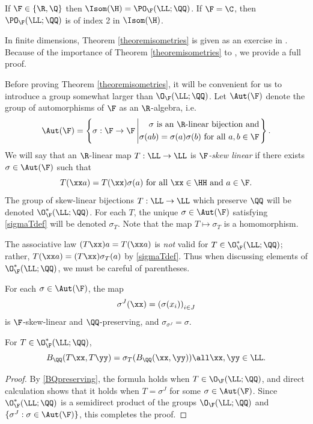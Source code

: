 \begin{theorem}
\label{theoremisometries}
If $\F\in\{\R,\Q\}$ then $\Isom(\H) = \PO_\F(\LL;\QQ)$. If $\F = \C$, then $\PO_\F(\LL;\QQ)$ is of index 2 in $\Isom(\H)$.
\end{theorem}
\begin{remark}
In finite dimensions, Theorem \ref{theoremisometries} is given as an exercise in \cite[Exercise II.10.21]{BridsonHaefliger}. Because of the importance of Theorem \ref{theoremisometries} to \thispaper, we provide a full proof.
\end{remark}
Before proving Theorem \ref{theoremisometries}, it will be convenient for us to introduce a group somewhat larger than $\O_\F(\LL;\QQ)$. Let $\Aut(\F)$ denote the group of automorphisms of $\F$ as an $\R$-algebra, i.e.
\[
\Aut(\F) = \left\{\sigma:\F\to\F \left|
\begin{split}
\text{$\sigma$ is an $\R$-linear bijection and}\\
\text{$\sigma(ab) = \sigma(a)\sigma(b)$ for all $a,b\in\F$}
\end{split}
\right.
\right\}.
\]
We will say that an $\R$-linear map $T:\LL\to\LL$ is \emph{$\F$-skew linear} if there exists $\sigma\in\Aut(\F)$ such that
\begin{equation}
\label{sigmaTdef}
T(\xx a) = T(\xx) \sigma(a) \text{ for all $\xx\in\HH$ and $a\in\F$}.
\end{equation}
The group of skew-linear bijections $T:\LL\to\LL$ which preserve $\QQ$ will be denoted $\O_\F^*(\LL;\QQ)$. For each $T$, the unique $\sigma\in\Aut(\F)$ satisfying \eqref{sigmaTdef} will be denoted $\sigma_T$. Note that the map $T\mapsto\sigma_T$ is a homomorphism.

\begin{warning*}
The associative law $(T\xx)a = T(\xx a)$ is \emph{not} valid for $T\in\O_\F^*(\LL;\QQ)$; rather, $T(\xx a) = (T\xx)\sigma_T(a)$ by \eqref{sigmaTdef}. Thus when discussing elements of $\O_\F^*(\LL;\QQ)$, we must be careful of parentheses.
\end{warning*}

\begin{example}
For each $\sigma\in\Aut(\F)$, the map
\[
\sigma^J(\xx) = \left(\sigma(x_i)\right)_{i\in J}
\]
is $\F$-skew-linear and $\QQ$-preserving, and $\sigma_{\sigma^J} = \sigma$.
\end{example}

\begin{observation}
\label{observationBQpreserving}
For $T\in\O_\F^*(\LL;\QQ)$,
\[
B_\QQ(T\xx,T\yy) = \sigma_T(B_\QQ(\xx,\yy)) \all \xx,\yy\in\LL.
\]
\end{observation}
\begin{proof}
By \eqref{BQpreserving}, the formula holds when $T\in\O_\F(\LL;\QQ)$, and direct calculation shows that it holds when $T = \sigma^J$ for some $\sigma\in\Aut(\F)$. Since $\O_\F^*(\LL;\QQ)$ is a semidirect product of the groups $\O_\F(\LL;\QQ)$ and $\{\sigma^J : \sigma\in\Aut(\F)\}$, this completes the proof.
\end{proof}

